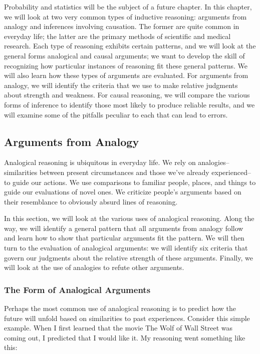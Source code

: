 Probability and statistics will be the subject of a future chapter. In this chapter, we will look at two
very common types of inductive reasoning: arguments from analogy and inferences involving
causation. The former are quite common in everyday life; the latter are the primary methods of
scientific and medical research. Each type of reasoning exhibits certain patterns, and we will look
at the general forms analogical and causal arguments; we want to develop the skill of recognizing
how particular instances of reasoning fit these general patterns. We will also learn how these types
of arguments are evaluated. For arguments from analogy, we will identify the criteria that we use
to make relative judgments about strength and weakness. For causal reasoning, we will compare
the various forms of inference to identify those most likely to produce reliable results, and we will
examine some of the pitfalls peculiar to each that can lead to errors.

\subsection{Arguments from Analogy}
Analogical reasoning is ubiquitous in everyday life. We rely on analogies--similarities between
present circumstances and those we've already experienced--to guide our actions. We use
comparisons to familiar people, places, and things to guide our evaluations of novel ones. We
criticize people's arguments based on their resemblance to obviously absurd lines of reasoning.

In this section, we will look at the various uses of analogical reasoning. Along the way, we will
identify a general pattern that all arguments from analogy follow and learn how to show that
particular arguments fit the pattern. We will then turn to the evaluation of analogical arguments:
we will identify six criteria that govern our judgments about the relative strength of these
arguments. Finally, we will look at the use of analogies to refute other arguments.

\subsubsection{The Form of Analogical Arguments}
Perhaps the most common use of analogical reasoning is to predict how the future will unfold
based on similarities to past experiences. Consider this simple example. When I first learned that
the movie The Wolf of Wall Street was coming out, I predicted that I would like it. My reasoning
went something like this:

